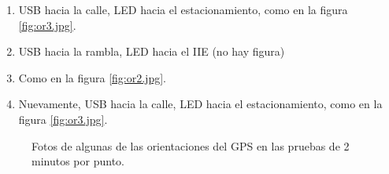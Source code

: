 \documentclass[spanish,12pt,a4paper,titlepage]{report}
\begin{document}
\begin{enumerate}
\item USB hacia la calle, LED hacia el estacionamiento, como en la figura \ref{fig:or3.jpg}.
\item USB hacia la rambla, LED hacia el IIE (no hay figura)
\item Como en la figura \ref{fig:or2.jpg}.
\item Nuevamente, USB hacia la calle, LED hacia el estacionamiento, como en la figura \ref{fig:or3.jpg}.
\end{enumerate}

\begin{figure} [h!]
  \centering
  \caption{Fotos de algunas de las orientaciones del GPS en las pruebas de 2 minutos por punto.}
  \label{fig:or-2-m}
\end{figure}
\end{document}
